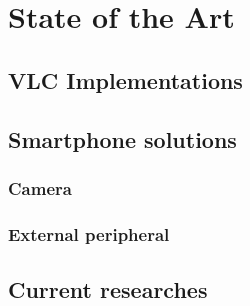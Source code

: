 
\chapter{State of the Art} %

\label{SoA} %



\section{VLC Implementations}


\section{Smartphone solutions}

\subsection{Camera}
\subsection{External peripheral}


\section{Current researches}